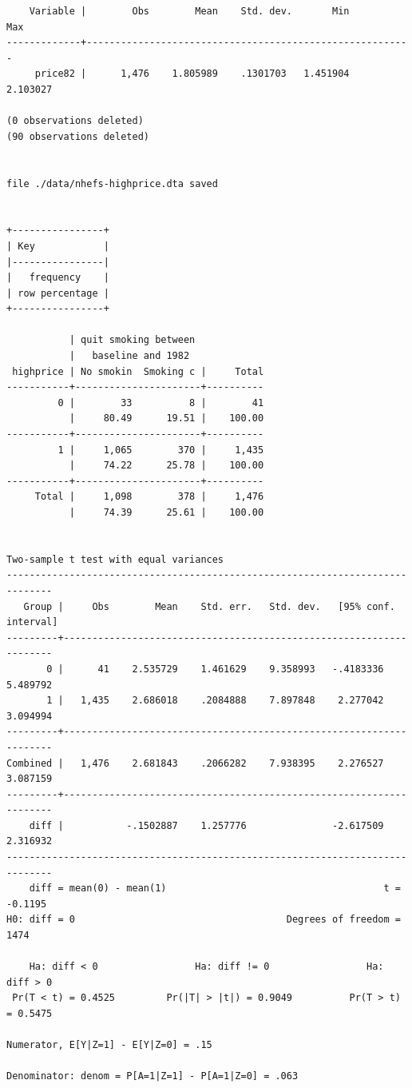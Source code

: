 \documentclass[
  10pt,
  a4paper,
]{book}
\begin{document}
\begin{verbatim}
    Variable |        Obs        Mean    Std. dev.       Min        Max
-------------+---------------------------------------------------------
     price82 |      1,476    1.805989    .1301703   1.451904   2.103027

(0 observations deleted)
(90 observations deleted)


file ./data/nhefs-highprice.dta saved


+----------------+
| Key            |
|----------------|
|   frequency    |
| row percentage |
+----------------+

           | quit smoking between
           |   baseline and 1982
 highprice | No smokin  Smoking c |     Total
-----------+----------------------+----------
         0 |        33          8 |        41 
           |     80.49      19.51 |    100.00 
-----------+----------------------+----------
         1 |     1,065        370 |     1,435 
           |     74.22      25.78 |    100.00 
-----------+----------------------+----------
     Total |     1,098        378 |     1,476 
           |     74.39      25.61 |    100.00 


Two-sample t test with equal variances
------------------------------------------------------------------------------
   Group |     Obs        Mean    Std. err.   Std. dev.   [95% conf. interval]
---------+--------------------------------------------------------------------
       0 |      41    2.535729    1.461629    9.358993   -.4183336    5.489792
       1 |   1,435    2.686018    .2084888    7.897848    2.277042    3.094994
---------+--------------------------------------------------------------------
Combined |   1,476    2.681843    .2066282    7.938395    2.276527    3.087159
---------+--------------------------------------------------------------------
    diff |           -.1502887    1.257776               -2.617509    2.316932
------------------------------------------------------------------------------
    diff = mean(0) - mean(1)                                      t =  -0.1195
H0: diff = 0                                     Degrees of freedom =     1474

    Ha: diff < 0                 Ha: diff != 0                 Ha: diff > 0
 Pr(T < t) = 0.4525         Pr(|T| > |t|) = 0.9049          Pr(T > t) = 0.5475

Numerator, E[Y|Z=1] - E[Y|Z=0] = .15

Denominator: denom = P[A=1|Z=1] - P[A=1|Z=0] = .063


\end{verbatim}
\end{document}
